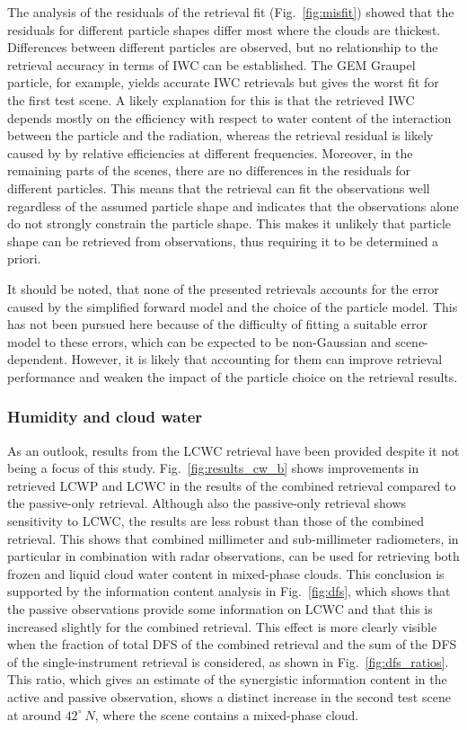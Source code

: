 \documentclass[journal abbreviation, manuscript]{copernicus}
\begin{document}
The analysis of the residuals of the retrieval fit (Fig.~\ref{fig:misfit})
showed that the residuals for different particle shapes differ most where the
clouds are thickest. Differences between different particles are observed, but
no relationship to the retrieval accuracy in terms of IWC can be established.
The GEM Graupel particle, for example, yields accurate IWC retrievals but gives
the worst fit for the first test scene. A likely explanation for this is that
the retrieved IWC depends mostly on the efficiency with respect to water content
of the interaction between the particle and the radiation, whereas the retrieval
residual is likely caused by by relative efficiencies at different frequencies.
Moreover, in the remaining parts of the scenes, there are no differences in the
residuals for different particles. This means that the retrieval can fit the
observations well regardless of the assumed particle shape and indicates that
the observations alone do not strongly constrain the particle shape. This makes
it unlikely that particle shape can be retrieved from observations, thus
requiring it to be determined a priori.

It should be noted, that none of the presented retrievals accounts for the error
caused by the simplified forward model and the choice of the particle model.
This has not been pursued here because of the difficulty of fitting a suitable
error model to these errors, which can be expected to be non-Gaussian and
scene-dependent. However, it is likely that accounting for them can improve
retrieval performance and weaken the impact of the particle choice on the
retrieval results.

\subsubsection{Humidity and cloud water}

As an outlook, results from the LCWC retrieval have been provided despite it not
being a focus of this study. Fig.~\ref{fig:results_cw_b} shows improvements in
retrieved LCWP and LCWC in the results of the combined retrieval compared to the
passive-only retrieval. Although also the passive-only retrieval shows
sensitivity to LCWC, the results are less robust than those of the combined
retrieval. This shows that combined millimeter and sub-millimeter radiometers,
in particular in combination with radar observations, can be used for retrieving
both frozen and liquid cloud water content in mixed-phase clouds. This
conclusion is supported by the information content analysis in
Fig.~\ref{fig:dfs}, which shows that the passive observations provide some
information on LCWC and that this is increased slightly for the combined
retrieval. This effect is more clearly visible when the fraction of total
DFS of the combined retrieval and the sum of the DFS of the single-instrument retrieval is considered, as shown in Fig.~\ref{fig:dfs_ratios}. This ratio,
which gives an estimate of the synergistic information content in the active
and passive observation, shows a distinct increase in the second test scene
at around $42^\circ\ N$, where the scene contains a mixed-phase cloud.
\end{document}
